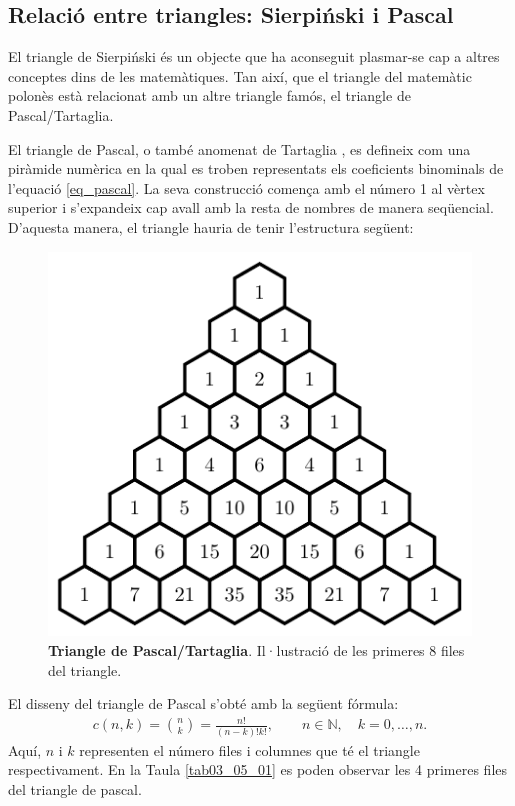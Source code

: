 \documentclass[12pt,a4paper]{report}
\begin{document}
\subsection{Relació entre triangles: Sierpiński i Pascal} 
El triangle de Sierpiński és un objecte que ha aconseguit plasmar-se cap a altres conceptes dins de les matemàtiques.  Tan així, que el triangle del matemàtic polonès està relacionat amb un altre triangle famós, el triangle de Pascal/Tartaglia.  

El triangle de Pascal, o també anomenat de Tartaglia \cite[p.~80]{ChaosFractal}, es defineix com una piràmide numèrica en la qual es troben representats els coeficients binominals de l'equació \ref{eq_pascal}.  La seva construcció comença amb el número 1 al vèrtex superior i s'expandeix cap avall amb la resta de nombres de manera seqüencial. D'aquesta manera, el triangle hauria de tenir l'estructura següent:

\begin{figure}[!ht]
\centering
\includegraphics[scale=.8]{img/img03_10_b_sierpinski.pdf}
\caption{\textbf{Triangle de Pascal/Tartaglia}. Il·lustració de les primeres 8 files del triangle.}
\end{figure}
 
El disseny del triangle de Pascal s'obté amb la següent fórmula:
\begin{align}\label{eq_pascal}
c(n,k)=\binom{n}{k}=\frac{n!}{(n-k)!k!}, \qquad n\in \mathbb{N},\quad k=0,\dots,n.
\end{align}
Aquí, $n$ i $k$ representen el número files i columnes que té el triangle respectivament. En la Taula \ref{tab03_05_01} es poden observar les 4 primeres files del triangle de pascal.
\end{document}

